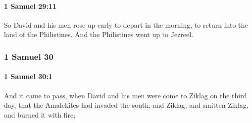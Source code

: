 		\paragraph{1 Samuel 29:11} %
			\label{1SAMUEL-29-11}

			So David and his men rose up early to depart in the morning, to return into the land of the Philistines. And the Philistines went up to Jezreel.

	\subsubsection{1 Samuel 30} %
		\label{1SAMUEL-30}

		\paragraph{1 Samuel 30:1} %
			\label{1SAMUEL-30-1}

			And it came to pass, when David and his men were come to Ziklag on the third day, that the Amalekites had invaded the south, and Ziklag, and smitten Ziklag, and burned it with fire;

